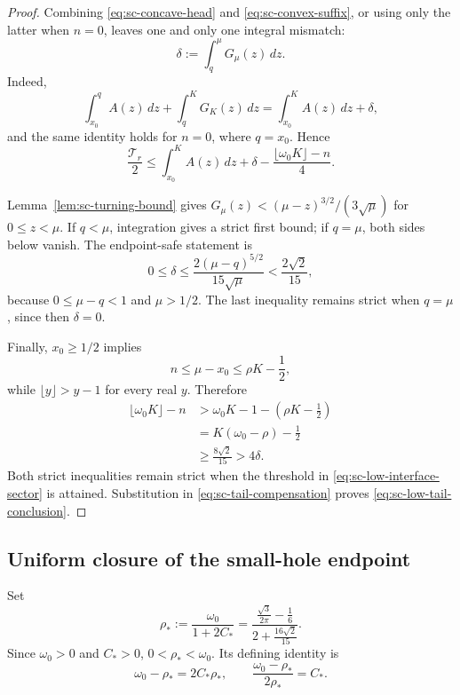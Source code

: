\documentclass[11pt]{article}
\numberwithin{equation}{section}
\theoremstyle{definition}
\theoremstyle{remark}
\begin{document}
\begin{proof}
Combining \eqref{eq:sc-concave-head} and
\eqref{eq:sc-convex-suffix}, or using only the latter when \(n=0\), leaves
one and only one integral mismatch:
\begin{equation}
  \delta:=\int_q^\mu G_\mu(z)\,dz.
  \label{eq:sc-interface-loss}
\end{equation}
Indeed,
\[
  \int_{x_0}^{q}A(z)\,dz+\int_q^KG_K(z)\,dz
  =\int_{x_0}^KA(z)\,dz+\delta,
\]
and the same identity holds for \(n=0\), where \(q=x_0\).  Hence
\begin{equation}
  \frac{\mathcal T_r}{2}
  \le\int_{x_0}^KA(z)\,dz
  +\delta-\frac{\lfloor\omega_0K\rfloor-n}{4}.
  \label{eq:sc-tail-compensation}
\end{equation}

Lemma~\ref{lem:sc-turning-bound} gives
\(G_\mu(z)<(\mu-z)^{3/2}/(3\sqrt\mu)\) for
\(0\leq z<\mu\).
If \(q<\mu\), integration gives a strict first bound; if \(q=\mu\), both
sides below vanish.  The endpoint-safe statement is
\begin{equation}
  0\le\delta
  \le\frac{2(\mu-q)^{5/2}}{15\sqrt\mu}
  <\frac{2\sqrt2}{15},
  \label{eq:sc-interface-loss-bound}
\end{equation}
because \(0\le\mu-q<1\) and \(\mu>1/2\).  The last inequality remains
strict when \(q=\mu\), since then \(\delta=0\).

Finally, \(x_0\ge1/2\) implies
\[
  n\le\mu-x_0\le\rho K-\frac12,
\]
while \(\lfloor y\rfloor>y-1\) for every real \(y\).  Therefore
\begin{align*}
  \lfloor\omega_0K\rfloor-n
  &>\omega_0K-1-\left(\rho K-\frac12\right)\\
  &=K(\omega_0-\rho)-\frac12\\
  &\ge\frac{8\sqrt2}{15}
  >4\delta.
\end{align*}
Both strict inequalities remain strict when the threshold in
\eqref{eq:sc-low-interface-sector} is attained.  Substitution in
\eqref{eq:sc-tail-compensation} proves
\eqref{eq:sc-low-tail-conclusion}.
\end{proof}

\subsection{Uniform closure of the small-hole endpoint}

Set
\begin{equation}
  \rho_*:=\frac{\omega_0}{1+2C_*}
  =\frac{\frac{\sqrt3}{2\pi}-\frac16}
  {2+\frac{16\sqrt2}{15}}.
  \label{eq:sc-rho-star}
\end{equation}
Since \(\omega_0>0\) and \(C_*>0\),
\(0<\rho_*<\omega_0\).  Its defining identity is
\begin{equation}
  \omega_0-\rho_*=2C_*\rho_*,
  \qquad
  \frac{\omega_0-\rho_*}{2\rho_*}=C_*.
  \label{eq:sc-rho-star-identity}
\end{equation}
\end{document}
